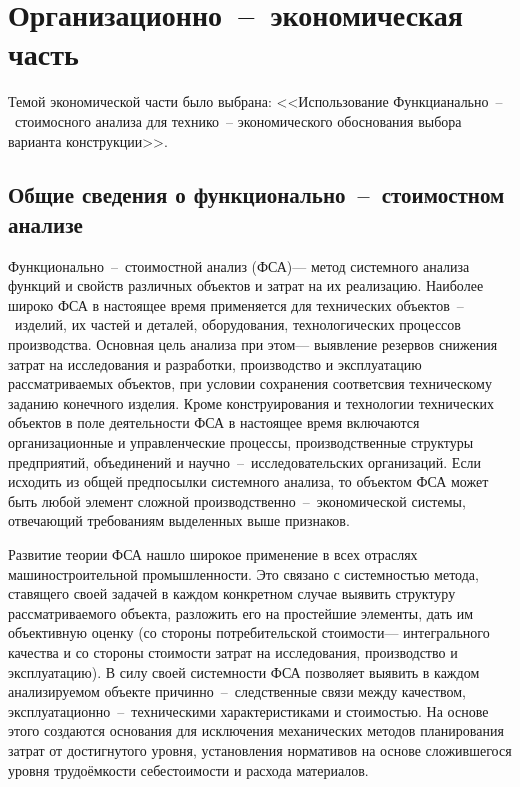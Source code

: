 \clearpage
\section{Организационно~--~экономическая часть}
Темой экономической части было выбрана: <<Использование Функцианально~--~стоимосного анализа для технико~--
экономического обоснования выбора варианта конструкции>>.
\subsection{Общие сведения о функционально~--~стоимостном анализе}
Функционально~--~стоимостной анализ (ФСА)--- метод системного
анализа функций и свойств различных объектов и затрат на их
реализацию.
Наиболее широко ФСА в настоящее время применяется для технических
объектов~--~изделий, их частей и деталей, оборудования, технологических процессов
производства.
Основная цель анализа при этом--- выявление резервов снижения затрат на
исследования и разработки, производство и эксплуатацию рассматриваемых объектов,
при условии сохранения соответсвия техническому заданию конечного изделия.
Кроме конструирования и технологии технических объектов в поле деятельности ФСА
в настоящее время включаются организационные и управленческие процессы,
производственные структуры предприятий, объединений и научно~--~исследовательских
организаций.
Если исходить из общей предпосылки системного анализа, то объектом ФСА может
быть любой элемент сложной производственно~--~экономической системы, отвечающий
требованиям выделенных выше признаков.


Развитие теории ФСА нашло широкое применение в всех отраслях машиностроительной
промышленности.
Это связано с системностью метода, ставящего своей задачей в каждом конкретном
случае выявить структуру рассматриваемого объекта, разложить его на простейшие
элементы, дать им объективную оценку (со стороны потребительской стоимости---
интегрального качества и со стороны стоимости затрат на исследования,
производство и эксплуатацию).
В силу своей системности ФСА позволяет выявить в каждом анализируемом объекте
причинно~--~следственные связи между качеством, эксплуатационно~--~техническими
характеристиками и стоимостью.
На основе этого создаются основания для исключения механических методов
планирования затрат от достигнутого уровня, установления нормативов на основе
сложившегося уровня трудоёмкости себестоимости и расхода материалов.


